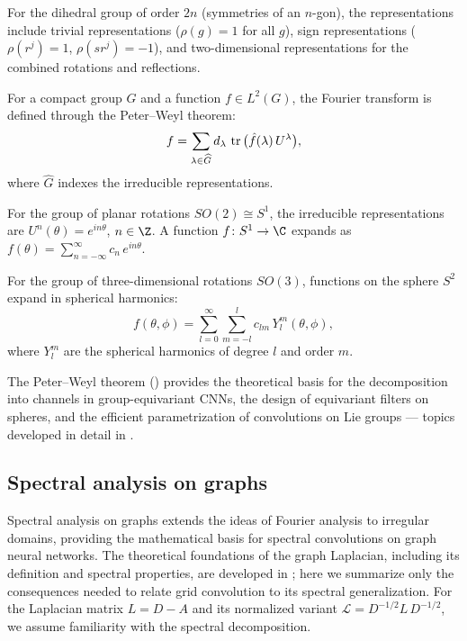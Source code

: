 \begin{example}
\label{ex:grids:dihedral-group}
For the dihedral group of order $2n$ (symmetries of an $n$-gon), the
representations include trivial representations ($\rho(g) = 1$ for all $g$), sign
representations ($\rho(r^j) = 1$, $\rho(sr^j) = -1$), and two-dimensional
representations for the combined rotations and reflections.
\end{example}

\begin{definition}
\label{def:grids:fourier-compact}
For a compact group $G$ and a function $f \in L^2(G)$, the Fourier transform is
defined through the Peter--Weyl theorem:
\[
  f = \sum_{\lambda \in \widehat{G}} d_\lambda\, \operatorname{tr}\big(\hat{f}(\lambda)\, U^\lambda\big),
\]
where $\widehat{G}$ indexes the irreducible representations.
\end{definition}

\begin{definition}
\label{def:grids:circular-harmonics}
For the group of planar rotations $SO(2) \cong S^1$, the irreducible
representations are $U^n(\theta) = e^{in\theta}$, $n \in \Z$. A function
$f \colon S^1 \to \C$ expands as
$f(\theta) = \sum_{n=-\infty}^{\infty} c_n\, e^{in\theta}$.
\end{definition}

\begin{definition}
\label{def:grids:spherical-harmonics}
For the group of three-dimensional rotations $SO(3)$, functions on the sphere
$S^2$ expand in spherical harmonics:
\[
  f(\theta, \phi) = \sum_{l=0}^{\infty} \sum_{m=-l}^{l} c_{lm}\, Y_l^m(\theta, \phi),
\]
where $Y_l^m$ are the spherical harmonics of degree $l$ and order $m$.
\end{definition}

The Peter--Weyl theorem () provides the theoretical basis
for the decomposition into channels in group-equivariant CNNs, the design of
equivariant filters on spheres, and the efficient parametrization of
convolutions on Lie groups --- topics developed in detail in .

\subsection{Spectral analysis on graphs}
\label{sec:grids:spectral-graphs}

Spectral analysis on graphs extends the ideas of Fourier analysis to irregular
domains, providing the mathematical basis for spectral convolutions on graph
neural networks. The theoretical foundations of the graph Laplacian, including
its definition and spectral properties, are developed in ; here
we summarize only the consequences needed to relate grid convolution to its
spectral generalization. For the Laplacian matrix $L = D - A$ and its normalized
variant $\mathcal{L} = D^{-1/2} L\, D^{-1/2}$, we assume familiarity with the
spectral decomposition.

